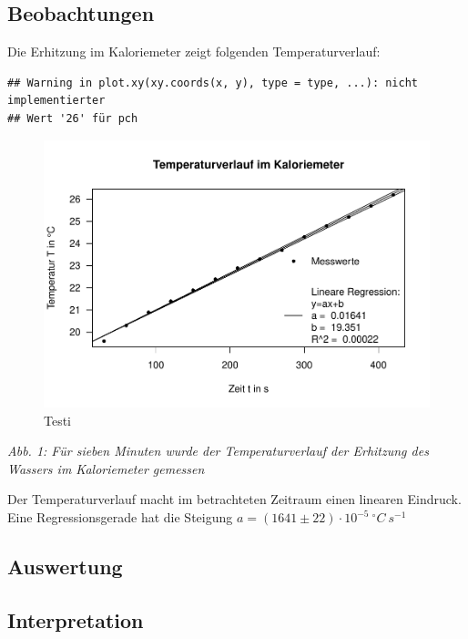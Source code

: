 \documentclass[
  9pt,
]{article}
\begin{document}
\hypertarget{beobachtungen}{%
\subsection{Beobachtungen}\label{beobachtungen}}

Die Erhitzung im Kaloriemeter zeigt folgenden Temperaturverlauf:

\begin{verbatim}
## Warning in plot.xy(xy.coords(x, y), type = type, ...): nicht implementierter
## Wert '26' für pch
\end{verbatim}

\begin{figure}

{\centering \includegraphics{Kaloriemeter_files/figure-latex/unnamed-chunk-1-1} 

}

\caption{Testi}\label{fig:unnamed-chunk-1}
\end{figure}

\emph{Abb. 1: Für sieben Minuten wurde der Temperaturverlauf der
Erhitzung des Wassers im Kaloriemeter gemessen}

Der Temperaturverlauf macht im betrachteten Zeitraum einen linearen
Eindruck. Eine Regressionsgerade hat die Steigung
\(a=(1641\pm 22)\cdot 10^{-5}\ ^{\circ} C\ s^{-1}\)

\hypertarget{auswertung}{%
\subsection{Auswertung}\label{auswertung}}

\hypertarget{interpretation}{%
\subsection{Interpretation}\label{interpretation}}
\end{document}
